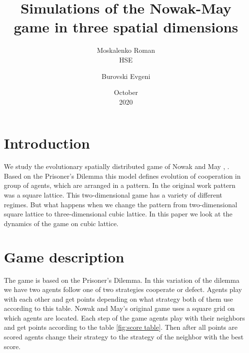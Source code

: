 \documentclass[a4paper,12pt]{article}
\title{Simulations of the Nowak-May game in three spatial dimensions}
\author{Moskalenko Roman \\ HSE
\and Burovski Evgeni}
\date{October \\ 2020}
\begin{document}
\maketitle

\section{Introduction}

We study the evolutionary spatially distributed game of Nowak and May \cite{nowak and may 1}, \cite{nowak and may 2}. Based on the Prisoner’s Dilemma this model defines evolution of cooperation in group of agents, which are arranged in a pattern. In the original work pattern was a square lattice. This two-dimensional game has a variety of different regimes. But what happens when we change the pattern from two-dimensional square lattice to three-dimensional cubic lattice. In this paper we look at the dynamics of the game on cubic lattice.


\section{Game description}

The game is based on the Prisoner’s Dilemma. In this variation of the dilemma we have two agents follow one of two strategies cooperate or defect. Agents play with each other and get points depending on what strategy both of them use according to this table. Nowak and May's original game uses a square grid on which agents are located. Each step of the game agents play with their neighbors and get points according to the table \ref{fig:score table}. Then after all points are scored agents change their strategy to the strategy of the neighbor with the best score.
\end{document}
